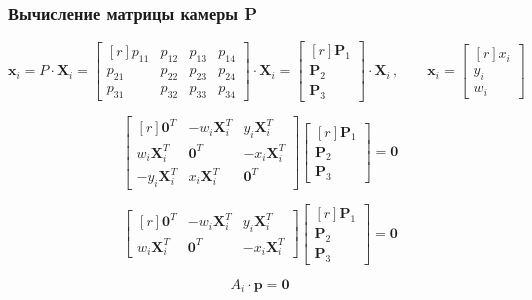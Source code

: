 \documentclass[12pt,usepdftitle=false,aspectratio=1610]{beamer}
\begin{document}
\begin{frame}
    \frametitle{Вычисление матрицы камеры P}
    $$
        \mathbf{x}_i = P\cdot\mathbf{X}_i=
        \begin{bmatrix*}[r]
                p_{11} & p_{12} & p_{13} & p_{14}\\
                p_{21} & p_{22} & p_{23} & p_{24}\\
                p_{31} & p_{32} & p_{33} & p_{34}
        \end{bmatrix*}\cdot\mathbf{X}_i
        =
        \begin{bmatrix*}[r]
            \mathbf{P}_1\\ \mathbf{P}_2\\ \mathbf{P}_3 
        \end{bmatrix*}\cdot\mathbf{X}_i
        \,,\qquad
        \mathbf{x}_i=
        \begin{bmatrix*}[r]
            x_i\\ y_i\\ w_i 
        \end{bmatrix*}
    $$
    \medskip

    $$
        \begin{bmatrix*}[r]
            \mathbf{0}^T & -w_i\mathbf{X}_i^T & y_i\mathbf{X}_i^T\\
            w_i\mathbf{X}_i^T & \mathbf{0}^T & -x_i\mathbf{X}_i^T\\
            -y_i\mathbf{X}_i^T & x_i\mathbf{X}_i^T & \mathbf{0}^T
        \end{bmatrix*}
        \begin{bmatrix*}[r]
            \mathbf{P}_1\\ \mathbf{P}_2\\ \mathbf{P}_3 
        \end{bmatrix*}=
        \mathbf{0}
    $$
    \medskip

    $$
        \begin{bmatrix*}[r]
            \mathbf{0}^T & -w_i\mathbf{X}_i^T & y_i\mathbf{X}_i^T\\
            w_i\mathbf{X}_i^T & \mathbf{0}^T & -x_i\mathbf{X}_i^T
        \end{bmatrix*}
        \begin{bmatrix*}[r]
            \mathbf{P}_1\\ \mathbf{P}_2\\ \mathbf{P}_3 
        \end{bmatrix*}=
        \mathbf{0}
    $$
    \medskip

    $$
        A_i\cdot\mathbf{p}=\mathbf{0}
    $$
\end{frame}
\end{document}
